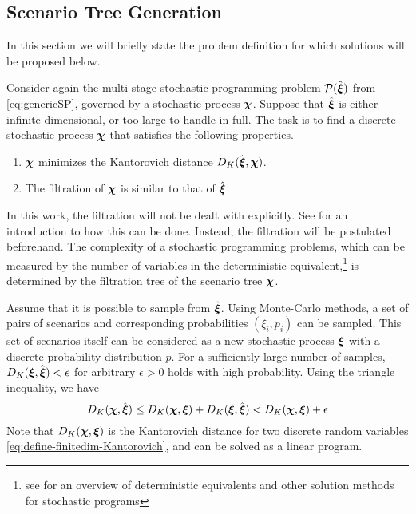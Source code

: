 \subsection{Scenario Tree Generation}
In this section we will briefly state the problem definition for which solutions will be proposed below.

Consider again the multi-stage stochastic programming problem $\mathcal{P}(\hat{\boldsymbol\xi})$ from \eqref{eq:genericSP}, governed by a stochastic process $\boldsymbol\chi$.
Suppose that $\hat{\boldsymbol\xi}$ is either infinite dimensional, or too large to handle in full.
The task is to find a discrete stochastic process $\boldsymbol\chi$ that satisfies the following properties.
\begin{enumerate}
\item $\boldsymbol\chi$ minimizes the Kantorovich distance $D_K(\hat{\boldsymbol\xi},\boldsymbol\chi)$.
\item The filtration of $\boldsymbol\chi$ is similar to that of $\hat{\boldsymbol\xi}$.
\end{enumerate}
In this work, the filtration will not be dealt with explicitly.
See  for an introduction to how this can be done.
Instead, the filtration will be postulated beforehand.
The complexity of a stochastic programming problems, which can be measured by the number of variables in the deterministic equivalent,\footnote{see  for an overview of deterministic equivalents and other solution methods for stochastic programs} is determined by the filtration tree of the scenario tree $\boldsymbol\chi$.

Assume that it is possible to sample from $\hat{\boldsymbol\xi}$.
Using Monte-Carlo methods, a set of pairs of scenarios and corresponding probabilities $(\xi_i,p_i)$ can be sampled.
This set of scenarios itself can be considered as a new stochastic process $\boldsymbol\xi$ with a discrete probability distribution $p$.
For a sufficiently large number of samples,  $D_K(\boldsymbol\xi,\hat{\boldsymbol\xi})<\epsilon$ for arbitrary $\epsilon>0$ holds with high probability.
Using the triangle inequality, we have
\begin{equation}
  \label{eq:triangle-montecarlo-kantoro}
  D_K(\boldsymbol\chi,\hat{\boldsymbol\xi}) \leq  D_K(\boldsymbol\chi, \boldsymbol\xi) + D_K(\boldsymbol\xi,\hat{\boldsymbol\xi})< D_K(\boldsymbol\chi,\boldsymbol\xi)+ \epsilon
\end{equation}
Note that $D_K(\boldsymbol\chi,\boldsymbol\xi)$ is the Kantorovich distance for two discrete random variables \eqref{eq:define-finitedim-Kantorovich}, and can be solved as a linear program.

